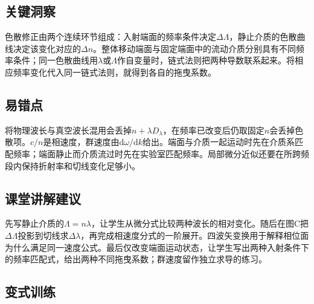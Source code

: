 \documentclass[UTF8,fontset=fandol,a4paper,11pt]{ctexart}
\begin{document}


\subsection*{关键洞察}

色散修正由两个连续环节组成：入射端面的频率条件决定$\Delta\Lambda$，静止介质的色散曲线决定该变化对应的$\Delta n$。整体移动端面与固定端面中的流动介质分别具有不同频率条件；同一色散曲线用$\lambda$或$\Lambda$作自变量时，链式法则把两种导数联系起来。将相应频率变化代入同一链式法则，就得到各自的拖曳系数。



\subsection*{易错点}

将物理波长与真空波长混用会丢掉$n+\lambda D_\lambda$，在频率已改变后仍取固定$n$会丢掉色散项。$c/n$是相速度，群速度由$\mathrm d\omega/\mathrm dk$给出。端面与介质一起运动时先在介质系匹配频率；端面静止而介质流过时先在实验室匹配频率。局部微分近似还要在所跨频段内保持折射率和切线变化足够小。



\subsection*{课堂讲解建议}

先写静止介质的$\Lambda=n\lambda$，让学生从微分式比较两种波长的相对变化。随后在图C把$\Delta\Lambda$投影到切线求$\Delta\lambda$，再完成相速度分式的一阶展开。四波矢变换用于解释相位面为什么满足同一速度公式。最后仅改变端面运动状态，让学生写出两种入射条件下的频率匹配式，给出两种不同拖曳系数；群速度留作独立求导的练习。



\subsection*{变式训练}
\end{document}
